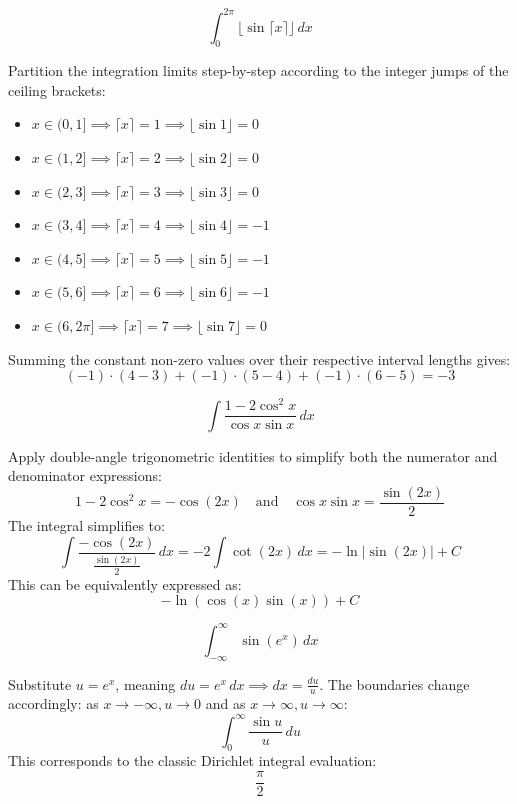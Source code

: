 \begin{questions}
    \question \[ \int_0^{2\pi} \lfloor \sin \lceil x \rceil \rfloor \,dx \]
    \begin{solution}
        Partition the integration limits step-by-step according to the integer jumps of the ceiling brackets:
        \begin{itemize}
            \item $x \in (0, 1] \implies \lceil x \rceil = 1 \implies \lfloor \sin 1 \rfloor = 0$
            \item $x \in (1, 2] \implies \lceil x \rceil = 2 \implies \lfloor \sin 2 \rfloor = 0$
            \item $x \in (2, 3] \implies \lceil x \rceil = 3 \implies \lfloor \sin 3 \rfloor = 0$
            \item $x \in (3, 4] \implies \lceil x \rceil = 4 \implies \lfloor \sin 4 \rfloor = -1$
            \item $x \in (4, 5] \implies \lceil x \rceil = 5 \implies \lfloor \sin 5 \rfloor = -1$
            \item $x \in (5, 6] \implies \lceil x \rceil = 6 \implies \lfloor \sin 6 \rfloor = -1$
            \item $x \in (6, 2\pi] \implies \lceil x \rceil = 7 \implies \lfloor \sin 7 \rfloor = 0$
        \end{itemize}
        Summing the constant non-zero values over their respective interval lengths gives:
        \[ (-1) \cdot (4-3) + (-1) \cdot (5-4) + (-1) \cdot (6-5) = -3 \]
    \end{solution}

    \question \[ \int \frac{1 - 2\cos^2 x}{\cos x \sin x} \,dx \]
    \begin{solution}
        Apply double-angle trigonometric identities to simplify both the numerator and denominator expressions:
        \[ 1 - 2\cos^2 x = -\cos(2x) \quad \text{and} \quad \cos x \sin x = \frac{\sin(2x)}{2} \]
        The integral simplifies to:
        \[ \int \frac{-\cos(2x)}{\frac{\sin(2x)}{2}} \,dx = -2 \int \cot(2x) \,dx = -\ln|\sin(2x)| + C \]
        This can be equivalently expressed as:
        \[ -\ln(\cos(x)\sin(x)) + C \]
    \end{solution}

    \question \[ \int_{-\infty}^\infty \sin(e^x) \,dx \]
    \begin{solution}
        Substitute $u = e^x$, meaning $du = e^x \,dx \implies dx = \frac{du}{u}$. The boundaries change accordingly: as $x \to -\infty, u \to 0$ and as $x \to \infty, u \to \infty$:
        \[ \int_0^\infty \frac{\sin u}{u} \,du \]
        This corresponds to the classic Dirichlet integral evaluation:
        \[ \frac{\pi}{2} \]
    \end{solution}

\end{questions}

